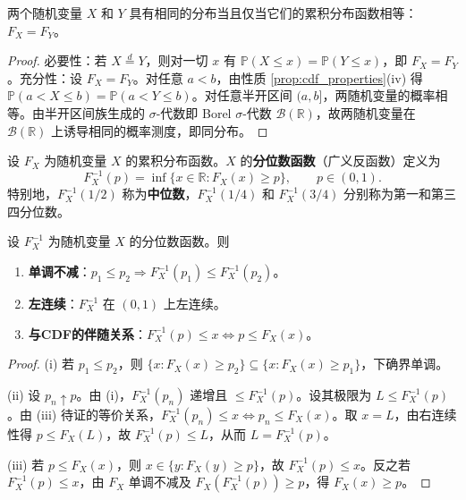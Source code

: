 \begin{theorem}[CDF与分布的一一对应]\label{thm:cdf_uniqueness}
两个随机变量 $X$ 和 $Y$ 具有相同的分布当且仅当它们的累积分布函数相等：$F_X = F_Y$。
\end{theorem}

\begin{proof}
必要性：若 $X\stackrel{d}{=}Y$，则对一切 $x$ 有 $\mathbb P(X\le x)=\mathbb P(Y\le x)$，即 $F_X=F_Y$。充分性：设 $F_X = F_Y$。对任意 $a < b$，由性质 \ref{prop:cdf_properties}(iv) 得 $\mathbb{P}(a < X \le b) = \mathbb{P}(a < Y \le b)$。对任意半开区间 $(a, b]$，两随机变量的概率相等。由半开区间族生成的 $\sigma$-代数即 Borel $\sigma$-代数 $\mathcal{B}(\mathbb{R})$，故两随机变量在 $\mathcal{B}(\mathbb{R})$ 上诱导相同的概率测度，即同分布。
\end{proof}

\begin{definition}[分位数函数]\label{def:quantile}
设 $F_X$ 为随机变量 $X$ 的累积分布函数。$X$ 的\textbf{分位数函数}（广义反函数）定义为
\[
F_X^{-1}(p) = \inf\{x \in \mathbb{R} : F_X(x) \ge p\}, \qquad p \in (0, 1).
\]
特别地，$F_X^{-1}(1/2)$ 称为\textbf{中位数}，$F_X^{-1}(1/4)$ 和 $F_X^{-1}(3/4)$ 分别称为第一和第三四分位数。
\end{definition}

\begin{proposition}[分位数函数的基本性质]\label{prop:quantile_properties}
设 $F_X^{-1}$ 为随机变量 $X$ 的分位数函数。则
\begin{enumerate}[label=(\roman*)]
    \item \textbf{单调不减}：$p_1 \le p_2 \Rightarrow F_X^{-1}(p_1) \le F_X^{-1}(p_2)$。
    \item \textbf{左连续}：$F_X^{-1}$ 在 $(0,1)$ 上左连续。
    \item \textbf{与CDF的伴随关系}：$F_X^{-1}(p) \le x \iff p \le F_X(x)$。
\end{enumerate}
\end{proposition}

\begin{proof}
(i) 若 $p_1 \le p_2$，则 $\{x : F_X(x) \ge p_2\} \subseteq \{x : F_X(x) \ge p_1\}$，下确界单调。

(ii) 设 $p_n \uparrow p$。由 (i)，$F_X^{-1}(p_n)$ 递增且 $\le F_X^{-1}(p)$。设其极限为 $L \le F_X^{-1}(p)$。由 (iii) 待证的等价关系，$F_X^{-1}(p_n) \le x \iff p_n \le F_X(x)$。取 $x = L$，由右连续性得 $p \le F_X(L)$，故 $F_X^{-1}(p) \le L$，从而 $L = F_X^{-1}(p)$。

(iii) 若 $p \le F_X(x)$，则 $x \in \{y : F_X(y) \ge p\}$，故 $F_X^{-1}(p) \le x$。反之若 $F_X^{-1}(p) \le x$，由 $F_X$ 单调不减及 $F_X(F_X^{-1}(p)) \ge p$，得 $F_X(x) \ge p$。
\end{proof}

